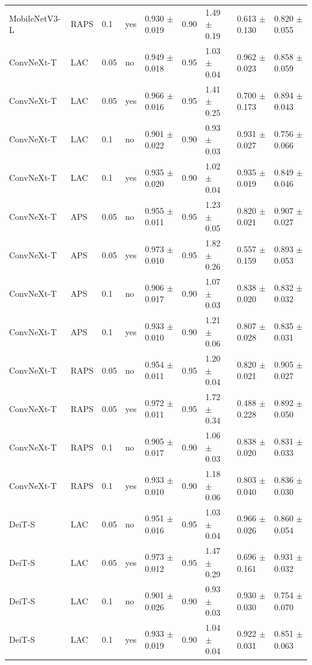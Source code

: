 \begin{table}[ht]
\begin{tabular}{lllllllll}
MobileNetV3-L & RAPS & 0.1 & yes & 0.930 $\pm$ 0.019 & 0.90 & 1.49 $\pm$ 0.19 & 0.613 $\pm$ 0.130 & 0.820 $\pm$ 0.055 \\
ConvNeXt-T & LAC & 0.05 & no & 0.949 $\pm$ 0.018 & 0.95 & 1.03 $\pm$ 0.04 & 0.962 $\pm$ 0.023 & 0.858 $\pm$ 0.059 \\
ConvNeXt-T & LAC & 0.05 & yes & 0.966 $\pm$ 0.016 & 0.95 & 1.41 $\pm$ 0.25 & 0.700 $\pm$ 0.173 & 0.894 $\pm$ 0.043 \\
ConvNeXt-T & LAC & 0.1 & no & 0.901 $\pm$ 0.022 & 0.90 & 0.93 $\pm$ 0.03 & 0.931 $\pm$ 0.027 & 0.756 $\pm$ 0.066 \\
ConvNeXt-T & LAC & 0.1 & yes & 0.935 $\pm$ 0.020 & 0.90 & 1.02 $\pm$ 0.04 & 0.935 $\pm$ 0.019 & 0.849 $\pm$ 0.046 \\
ConvNeXt-T & APS & 0.05 & no & 0.955 $\pm$ 0.011 & 0.95 & 1.23 $\pm$ 0.05 & 0.820 $\pm$ 0.021 & 0.907 $\pm$ 0.027 \\
ConvNeXt-T & APS & 0.05 & yes & 0.973 $\pm$ 0.010 & 0.95 & 1.82 $\pm$ 0.26 & 0.557 $\pm$ 0.159 & 0.893 $\pm$ 0.053 \\
ConvNeXt-T & APS & 0.1 & no & 0.906 $\pm$ 0.017 & 0.90 & 1.07 $\pm$ 0.03 & 0.838 $\pm$ 0.020 & 0.832 $\pm$ 0.032 \\
ConvNeXt-T & APS & 0.1 & yes & 0.933 $\pm$ 0.010 & 0.90 & 1.21 $\pm$ 0.06 & 0.807 $\pm$ 0.028 & 0.835 $\pm$ 0.031 \\
ConvNeXt-T & RAPS & 0.05 & no & 0.954 $\pm$ 0.011 & 0.95 & 1.20 $\pm$ 0.04 & 0.820 $\pm$ 0.021 & 0.905 $\pm$ 0.027 \\
ConvNeXt-T & RAPS & 0.05 & yes & 0.972 $\pm$ 0.011 & 0.95 & 1.72 $\pm$ 0.34 & 0.488 $\pm$ 0.228 & 0.892 $\pm$ 0.050 \\
ConvNeXt-T & RAPS & 0.1 & no & 0.905 $\pm$ 0.017 & 0.90 & 1.06 $\pm$ 0.03 & 0.838 $\pm$ 0.020 & 0.831 $\pm$ 0.033 \\
ConvNeXt-T & RAPS & 0.1 & yes & 0.933 $\pm$ 0.010 & 0.90 & 1.18 $\pm$ 0.06 & 0.803 $\pm$ 0.040 & 0.836 $\pm$ 0.030 \\
DeiT-S & LAC & 0.05 & no & 0.951 $\pm$ 0.016 & 0.95 & 1.03 $\pm$ 0.04 & 0.966 $\pm$ 0.026 & 0.860 $\pm$ 0.054 \\
DeiT-S & LAC & 0.05 & yes & 0.973 $\pm$ 0.012 & 0.95 & 1.47 $\pm$ 0.29 & 0.696 $\pm$ 0.161 & 0.931 $\pm$ 0.032 \\
DeiT-S & LAC & 0.1 & no & 0.901 $\pm$ 0.026 & 0.90 & 0.93 $\pm$ 0.03 & 0.930 $\pm$ 0.030 & 0.754 $\pm$ 0.070 \\
DeiT-S & LAC & 0.1 & yes & 0.933 $\pm$ 0.019 & 0.90 & 1.04 $\pm$ 0.04 & 0.922 $\pm$ 0.031 & 0.851 $\pm$ 0.063 \\

\end{tabular}
\end{table}
